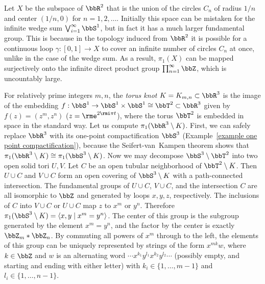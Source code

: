 \begin{example}\label{hawaiian earring}
    Let $X$ be the subspace of $\bbR^2$ that is the union of the circles $C_n$ of radius $1/n$ and center $(1/n, 0)$ for $n = 1, 2, \ldots$. Initially this space can be mistaken for the infinite wedge sum $\bigvee_{i=1}^\infty \bbS^1$, but in fact it has a much larger fundamental group. This is because in the topology induced from $\bbR^2$ it is possible for a continuous loop $\gamma:[0,1]\to X$ to cover an infinite number of circles $C_n$ at once, unlike in the case of the wedge sum. As a result, $\pi_1(X)$ can be mapped surjectively onto the infinite direct product group $\prod_{n=1}^\infty \bbZ$, which is uncountably large. 
\end{example}

\begin{example}
    For relatively prime integers $m,n$, the \emph{torus knot} $K=K_{m,n}\subset \bbR^3$ is the image of the embedding $f:\bbS^1\to \bbS^1\times \bbS^1\cong \bbT^2\subset\bbR^3$ given by $f(z)=(z^m,z^n)$ ($z=\rme^{2\rmi\pi t}$), where the torus $\bbT^2$ is embedded in space in the standard way. Let us compute $\pi_1(\bbR^3\setminus K)$. First, we can safely replace $\bbR^3$ with its one-point compactification $\bbS^3$ (Example~\ref{example one point compactification}), because the Seifert-van~Kampen theorem shows that $\pi_1(\bbR^3\setminus K)\cong\pi_1(\bbS^3\setminus K)$. Now we may decompose $\bbS^3\setminus \bbT^2$ into two open solid tori $U,V$. Let $C$ be an open tubular neighborhood of $\bbT^2\setminus K$. Then $U\cup C$ and $V\cup C$ form an open covering of $\bbS^3\setminus K$ with a path-connected intersection. The fundamental groups of $U\cup C$, $V\cup C$, and the intersection $C$ are all isomorphic to $\bbZ$ and generated by loops $x,y,z$, respectively. The inclusions of $C$ into $V\cup C$ or $U\cup C$ map $z$ to $x^m$ or $y^n$. Therefore $\pi_1(\bbS^3\setminus K)=\langle x,y\mid x^m=y^n\rangle$. The center of this group is the subgroup generated by the element $x^m=y^n$, and the factor by the center is exactly $\bbZ_m\ast\bbZ_n$. By commuting all powers of $x^m$ through to the left, the elements of this group can be uniquely represented by strings of the form $x^{mk}w$, where $k\in\bbZ$ and $w$ is an alternating word $\cdots x^{k_1}y^{l_1}x^{k_2}y^{l_2}\cdots$ (possibly empty, and starting and ending with either letter) with $k_i\in\{1,\ldots,m-1\}$ and $l_i\in\{1,\ldots,n-1\}$.
\end{example}

